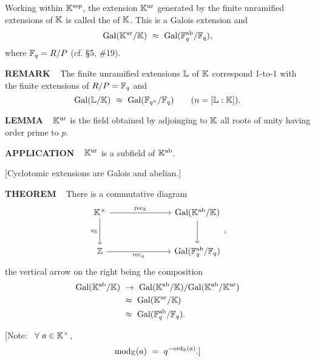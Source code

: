Working within $\mathbb{K}^{\text{sep}}$, the extension $\mathbb{K}^{\text{ur}}$ generated by the finite unramified extensions of $\mathbb{K}$ is called the 
of $\mathbb{K}$.  
This is a Galois extension and
\[
\Gal(\K^\ur / \K) \ \approx \ \Gal(\F_q^\ab / \F_q),
\]
where $\mathbb{F}_q = R/P$ (cf. \S5, \#19).

\vspace{0.25cm}

\begin{x}{\small\bf REMARK} \ %
The finite unramified extensions $\mathbb{L}$ of $\mathbb{K}$ correspond 1-to-1 with the finite extensions of $R/P = \mathbb{F}_q$ and 
\[
\text{Gal}(\mathbb{L} / \mathbb{K})  \ \approx \ \text{Gal}(\mathbb{F}_{q^n} / \mathbb{F}_q) \qquad (n = [\mathbb{L}:\mathbb{K}]).
\]
\end{x}

\vspace{0.1cm}


\begin{x}{\small\bf LEMMA} \ %
$\mathbb{K}^{\text{ur}}$ is the field obtained by adjoinging to $\mathbb{K}$ all roots of unity having order prime to $p$.
\end{x}
\vspace{0.1cm}

\begin{x}{\small\bf APPLICATION} \ %
$\mathbb{K}^{\text{ur}}$ is a subfield of $\mathbb{K}^{\text{ab}}$.

\vspace{0.1cm}

[Cyclotomic extensions are Galois and abelian.]
\end{x}
\vspace{0.1cm}

\begin{x}{\small\bf THEOREM} \ %
There is a commutative diagram
\[
\begin{tikzcd}[sep=large]
{\K^\times} \ar{d}[swap]{v_\K} \ar{rr}{\rec_\K}     &&{\Gal(\K^\ab / \K)} \ar{d} \\
{\Z}  \ar{rr}[swap]{\rec_q}        &&{\Gal(\F_q^\ab / \F_q)}
\end{tikzcd}
,
\]
the vertical arrow on the right being the composition
\begin{align*}
\Gal(\K^\ab/\K) \ 
&\ra \  \Gal(\K^\ab /\K) / \Gal(\K^\ab/\K^\ur) \\
&\approx \ \Gal(\K^\ur/\K)\\
&\approx \ \Gal(\F_q^\ab/\F_q).
\end{align*}


[Note: \ $\forall \ a \in \mathbb{K}^\times$, 
\[
\mods_\K(a) \ = \ q^{-\ord_\K(a)}.]
\]
\end{x}

